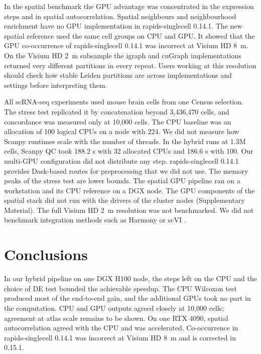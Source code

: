 \documentclass[runningheads]{llncs}
\begin{document}
In the spatial benchmark the GPU advantage was concentrated in the expression steps and in spatial autocorrelation.
Spatial neighbours and neighbourhood enrichment have no GPU implementation in rapids-singlecell 0.14.1.
The new spatial reference used the same cell groups on CPU and GPU.
It showed that the GPU co-occurrence of rapids-singlecell 0.14.1 was incorrect at Visium HD 8~\textmu{}m.
On the Visium HD 2~\textmu{}m subsample the igraph and cuGraph implementations returned very different partitions in every repeat.
Users working at this resolution should check how stable Leiden partitions are across implementations and settings before interpreting them.

All scRNA-seq experiments used mouse brain cells from one Census selection.
The stress test replicated it by concatenation beyond 3,436,470 cells, and concordance was measured only at 10,000 cells.
The CPU baseline was an allocation of 100 logical CPUs on a node with 224.
We did not measure how Scanpy runtimes scale with the number of threads.
In the hybrid runs at 1.3M cells, Scanpy QC took 188.2 s with 32 allocated CPUs and 186.6 s with 100.
Our multi-GPU configuration did not distribute any step.
rapids-singlecell 0.14.1 provides Dask-based routes for preprocessing that we did not use.
The memory peaks of the stress test are lower bounds.
The spatial GPU pipeline ran on a workstation and its CPU reference on a DGX node.
The GPU components of the spatial stack did not run with the drivers of the cluster nodes (Supplementary Material).
The full Visium HD 2~\textmu{}m resolution was not benchmarked.
We did not benchmark integration methods such as Harmony \cite{Korsunsky2019} or scVI \cite{Lopez2018}.

\hypertarget{conclusions}{%
\section{Conclusions}\label{conclusions}}

In our hybrid pipeline on one DGX H100 node, the steps left on the CPU and the choice of DE test bounded the achievable speedup.
The CPU Wilcoxon test produced most of the end-to-end gain, and the additional GPUs took no part in the computation.
CPU and GPU outputs agreed closely at 10,000 cells; agreement at atlas scale remains to be shown.
On one RTX 4090, spatial autocorrelation agreed with the CPU and was accelerated.
Co-occurrence in rapids-singlecell 0.14.1 was incorrect at Visium HD 8~\textmu{}m and is corrected in 0.15.1.
\end{document}
